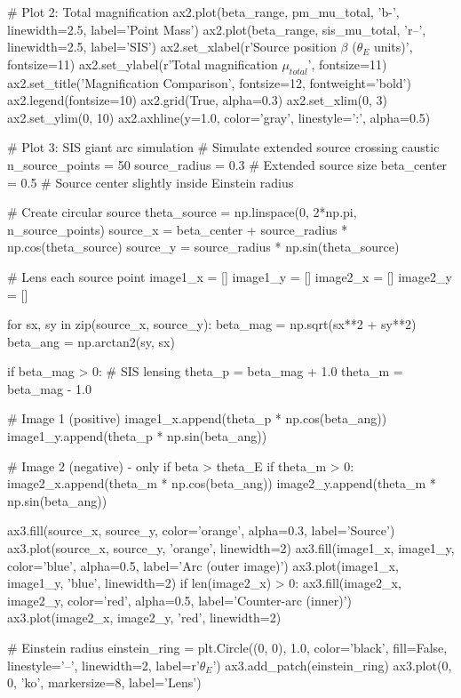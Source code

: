 \documentclass[11pt,a4paper]{article}
\begin{document}
\begin{pycode}
# Plot 2: Total magnification
ax2.plot(beta_range, pm_mu_total, 'b-', linewidth=2.5, label='Point Mass')
ax2.plot(beta_range, sis_mu_total, 'r--', linewidth=2.5, label='SIS')
ax2.set_xlabel(r'Source position $\beta$ ($\theta_E$ units)', fontsize=11)
ax2.set_ylabel(r'Total magnification $\mu_{total}$', fontsize=11)
ax2.set_title('Magnification Comparison', fontsize=12, fontweight='bold')
ax2.legend(fontsize=10)
ax2.grid(True, alpha=0.3)
ax2.set_xlim(0, 3)
ax2.set_ylim(0, 10)
ax2.axhline(y=1.0, color='gray', linestyle=':', alpha=0.5)

# Plot 3: SIS giant arc simulation
# Simulate extended source crossing caustic
n_source_points = 50
source_radius = 0.3  # Extended source size
beta_center = 0.5  # Source center slightly inside Einstein radius

# Create circular source
theta_source = np.linspace(0, 2*np.pi, n_source_points)
source_x = beta_center + source_radius * np.cos(theta_source)
source_y = source_radius * np.sin(theta_source)

# Lens each source point
image1_x = []
image1_y = []
image2_x = []
image2_y = []

for sx, sy in zip(source_x, source_y):
    beta_mag = np.sqrt(sx**2 + sy**2)
    beta_ang = np.arctan2(sy, sx)

    if beta_mag > 0:
        # SIS lensing
        theta_p = beta_mag + 1.0
        theta_m = beta_mag - 1.0

        # Image 1 (positive)
        image1_x.append(theta_p * np.cos(beta_ang))
        image1_y.append(theta_p * np.sin(beta_ang))

        # Image 2 (negative) - only if beta > theta_E
        if theta_m > 0:
            image2_x.append(theta_m * np.cos(beta_ang))
            image2_y.append(theta_m * np.sin(beta_ang))

ax3.fill(source_x, source_y, color='orange', alpha=0.3, label='Source')
ax3.plot(source_x, source_y, 'orange', linewidth=2)
ax3.fill(image1_x, image1_y, color='blue', alpha=0.5, label='Arc (outer image)')
ax3.plot(image1_x, image1_y, 'blue', linewidth=2)
if len(image2_x) > 0:
    ax3.fill(image2_x, image2_y, color='red', alpha=0.5, label='Counter-arc (inner)')
    ax3.plot(image2_x, image2_y, 'red', linewidth=2)

# Einstein radius
einstein_ring = plt.Circle((0, 0), 1.0, color='black', fill=False,
                          linestyle='--', linewidth=2, label=r'$\theta_E$')
ax3.add_patch(einstein_ring)
ax3.plot(0, 0, 'ko', markersize=8, label='Lens')


\end{pycode}
\end{document}

